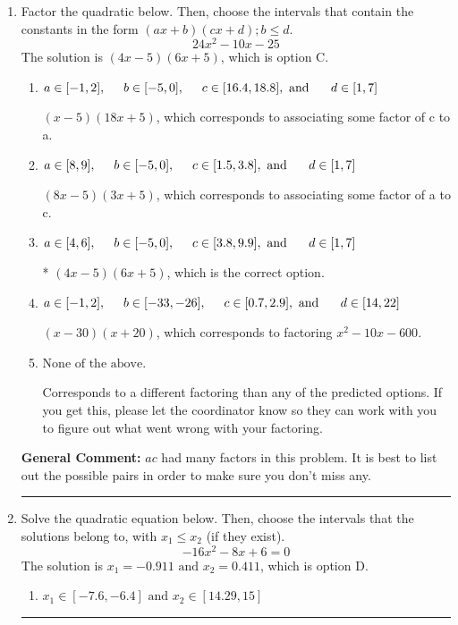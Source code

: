 \documentclass{extbook}[14pt]
\newcommand{\litem}[1]{\item #1

\rule{\textwidth}{0.4pt}}
\begin{document}
\begin{enumerate}\litem{
Factor the quadratic below. Then, choose the intervals that contain the constants in the form $(ax+b)(cx+d); b \leq d.$
\[ 24x^{2} -10 x -25 \]
The solution is \( (4x -5)(6x + 5) \), which is option C.\begin{enumerate}[label=\Alph*.]
\item \( a \in [-1, 2], \hspace*{5mm} b \in [-5, 0], \hspace*{5mm} c \in [16.4, 18.8], \text{ and } \hspace*{5mm} d \in [1, 7] \)

 $(x -5)(18x + 5)$, which corresponds to associating some factor of c to a.
\item \( a \in [8, 9], \hspace*{5mm} b \in [-5, 0], \hspace*{5mm} c \in [1.5, 3.8], \text{ and } \hspace*{5mm} d \in [1, 7] \)

 $(8x -5)(3x + 5)$, which corresponds to associating some factor of a to c.
\item \( a \in [4, 6], \hspace*{5mm} b \in [-5, 0], \hspace*{5mm} c \in [3.8, 9.9], \text{ and } \hspace*{5mm} d \in [1, 7] \)

* $(4x -5)(6x + 5)$, which is the correct option.
\item \( a \in [-1, 2], \hspace*{5mm} b \in [-33, -26], \hspace*{5mm} c \in [0.7, 2.9], \text{ and } \hspace*{5mm} d \in [14, 22] \)

 $(x -30)(x + 20)$, which corresponds to factoring $x^{2} -10 x -600$.
\item \( \text{None of the above.} \)

 Corresponds to a different factoring than any of the predicted options. If you get this, please let the coordinator know so they can work with you to figure out what went wrong with your factoring.
\end{enumerate}

\textbf{General Comment:} $ac$ had many factors in this problem. It is best to list out the possible pairs in order to make sure you don't miss any.
}
\litem{
Solve the quadratic equation below. Then, choose the intervals that the solutions belong to, with $x_1 \leq x_2$ (if they exist).
\[ -16x^{2} -8 x + 6 = 0 \]
The solution is \( x_1 = -0.911 \text{ and } x_2 = 0.411 \), which is option D.\begin{enumerate}[label=\Alph*.]
\item \( x_1 \in [-7.6, -6.4] \text{ and } x_2 \in [14.29, 15] \)


\end{enumerate}}
\end{enumerate}
\end{document}
